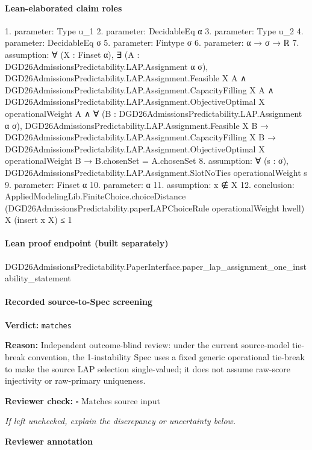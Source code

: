 \documentclass[10pt]{article}
\newcommand{\reviewerbox}{%
  \par\noindent\fbox{\parbox{0.96\linewidth}{\rule{0pt}{0.38in}}}\par
}
\newcommand{\reviewmatch}[1]{%
  \par\noindent\textbf{Reviewer check:} $\square$\; #1\par
  \noindent\emph{If left unchecked, explain the discrepancy or uncertainty below.}\par
}
\begin{document}
\paragraph{Lean-elaborated claim roles}\begin{ReviewVerbatim}
1. parameter: Type u_1
2. parameter: DecidableEq α
3. parameter: Type u_2
4. parameter: DecidableEq σ
5. parameter: Fintype σ
6. parameter: α → σ → ℝ
7. assumption: ∀ (X : Finset α),
  ∃ (A : DGD26AdmissionsPredictability.LAP.Assignment α σ),
    DGD26AdmissionsPredictability.LAP.Assignment.Feasible X A ∧
      DGD26AdmissionsPredictability.LAP.Assignment.CapacityFilling X A ∧
        DGD26AdmissionsPredictability.LAP.Assignment.ObjectiveOptimal X operationalWeight A ∧
          ∀ (B : DGD26AdmissionsPredictability.LAP.Assignment α σ),
            DGD26AdmissionsPredictability.LAP.Assignment.Feasible X B →
              DGD26AdmissionsPredictability.LAP.Assignment.CapacityFilling X B →
                DGD26AdmissionsPredictability.LAP.Assignment.ObjectiveOptimal X operationalWeight B →
                  B.chosenSet = A.chosenSet
8. assumption: ∀ (s : σ), DGD26AdmissionsPredictability.LAP.Assignment.SlotNoTies operationalWeight s
9. parameter: Finset α
10. parameter: α
11. assumption: x ∉ X
12. conclusion: AppliedModelingLib.FiniteChoice.choiceDistance
    (DGD26AdmissionsPredictability.paperLAPChoiceRule operationalWeight hwell) X (insert x X) ≤
  1
\end{ReviewVerbatim}

\paragraph{Lean proof endpoint (built separately)}\begin{ReviewVerbatim}
DGD26AdmissionsPredictability.PaperInterface.paper_lap_assignment_one_instability_statement
\end{ReviewVerbatim}

\paragraph{Recorded source-to-Spec screening}
\textbf{Verdict:} \texttt{matches}
\\
{\raggedright
\textbf{Reason:} Independent outcome-\allowbreak{}blind review:\allowbreak{} under the current source-\allowbreak{}model tie-\allowbreak{}break convention, the 1-\allowbreak{}instability Spec uses a fixed generic operational tie-\allowbreak{}break to make the source LAP selection single-\allowbreak{}valued;\allowbreak{} it does not assume raw-\allowbreak{}score injectivity or raw-\allowbreak{}primary uniqueness.\allowbreak{}
\par}
\reviewmatch{Matches source input}
\noindent\textbf{Reviewer annotation}\par
\reviewerbox
\clearpage
\hypertarget{source-claim-a0520310d6532be1}{}
\end{document}
